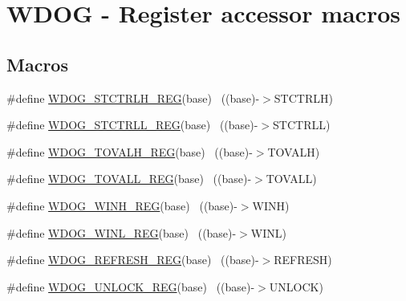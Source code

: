 \hypertarget{group___w_d_o_g___register___accessor___macros}{}\section{W\+D\+OG -\/ Register accessor macros}
\label{group___w_d_o_g___register___accessor___macros}
\subsection*{Macros}
\begin{DoxyCompactItemize}
\item 
\#define \hyperlink{group___w_d_o_g___register___accessor___macros_gafe3961a26965f4d22fa82eb4a6906efa}{W\+D\+O\+G\+\_\+\+S\+T\+C\+T\+R\+L\+H\+\_\+\+R\+EG}(base)                                  ~((base)-\/$>$S\+T\+C\+T\+R\+LH)
\item 
\#define \hyperlink{group___w_d_o_g___register___accessor___macros_gab5f636177e7295761f4d366fc6f2d9c5}{W\+D\+O\+G\+\_\+\+S\+T\+C\+T\+R\+L\+L\+\_\+\+R\+EG}(base)                                  ~((base)-\/$>$S\+T\+C\+T\+R\+LL)
\item 
\#define \hyperlink{group___w_d_o_g___register___accessor___macros_gaa18bf2a6abf1641d711ee0a8e963d704}{W\+D\+O\+G\+\_\+\+T\+O\+V\+A\+L\+H\+\_\+\+R\+EG}(base)                                    ~((base)-\/$>$T\+O\+V\+A\+LH)
\item 
\#define \hyperlink{group___w_d_o_g___register___accessor___macros_gaf4ebf9d6344af3fa4c4cf0219a334dac}{W\+D\+O\+G\+\_\+\+T\+O\+V\+A\+L\+L\+\_\+\+R\+EG}(base)                                    ~((base)-\/$>$T\+O\+V\+A\+LL)
\item 
\#define \hyperlink{group___w_d_o_g___register___accessor___macros_gacb494604d8f57ea1aa0a6d8c9921b955}{W\+D\+O\+G\+\_\+\+W\+I\+N\+H\+\_\+\+R\+EG}(base)                                        ~((base)-\/$>$W\+I\+NH)
\item 
\#define \hyperlink{group___w_d_o_g___register___accessor___macros_ga7d3de8371302abe17948011dd6ae8522}{W\+D\+O\+G\+\_\+\+W\+I\+N\+L\+\_\+\+R\+EG}(base)                                        ~((base)-\/$>$W\+I\+NL)
\item 
\#define \hyperlink{group___w_d_o_g___register___accessor___macros_ga706e227590678130bb2b7fc04e0263d1}{W\+D\+O\+G\+\_\+\+R\+E\+F\+R\+E\+S\+H\+\_\+\+R\+EG}(base)                                  ~((base)-\/$>$R\+E\+F\+R\+E\+SH)
\item 
\#define \hyperlink{group___w_d_o_g___register___accessor___macros_ga0424f1f517c5ed49f00c67fc4454bba5}{W\+D\+O\+G\+\_\+\+U\+N\+L\+O\+C\+K\+\_\+\+R\+EG}(base)                                    ~((base)-\/$>$U\+N\+L\+O\+CK)

\end{DoxyCompactItemize}
